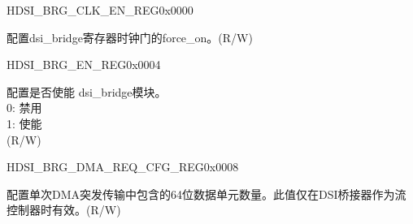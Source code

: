 \begin{register}{H}{DSI\_BRG\_CLK\_EN\_REG}{0x0000}\label{regdesc:DSIBRGCLKENREG}
%
%
\regnewline%
\begin{regdesc}\begin{reglist}
\label{fielddesc:DSIBRGCLKEN}\item [DSI\_BRG\_CLK\_EN] 配置dsi\_bridge寄存器时钟门的force\_on。(R/W)
\end{reglist}\end{regdesc}
\end{register}


\begin{register}{H}{DSI\_BRG\_EN\_REG}{0x0004}\label{regdesc:DSIBRGENREG}
%
%
\regnewline%
\begin{regdesc}\begin{reglist}
\label{fielddesc:DSIBRGDSIEN}\item [DSI\_BRG\_DSI\_EN] 配置是否使能 dsi\_bridge模块。\\0: 禁用\\1: 使能 \\(R/W)
\end{reglist}\end{regdesc}
\end{register}


\begin{register}{H}{DSI\_BRG\_DMA\_REQ\_CFG\_REG}{0x0008}\label{regdesc:DSIBRGDMAREQCFGREG}
%
%
\regnewline%
\begin{regdesc}\begin{reglist}
\label{fielddesc:DSIBRGDMABURSTLEN}\item [DSI\_BRG\_DMA\_BURST\_LEN] 配置单次DMA突发传输中包含的64位数据单元数量。此值仅在DSI桥接器作为流控制器时有效。(R/W)
\end{reglist}\end{regdesc}
\end{register}


